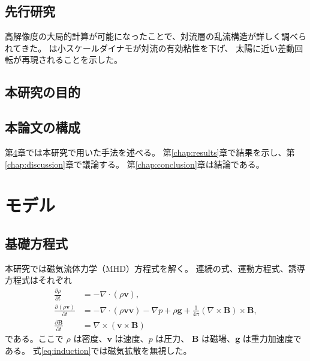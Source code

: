 \section{先行研究}
\label{sec:intro_previous}

高解像度の大局的計算が可能になったことで、対流層の乱流構造が詳しく調べられてきた。
\citet{hotta2021} は小スケールダイナモが対流の有効粘性を下げ、
太陽に近い差動回転が再現されることを示した。

\section{本研究の目的}
\label{sec:intro_purpose}


\section{本論文の構成}
\label{sec:intro_outline}

第\ref{chap:method}章では本研究で用いた手法を述べる。
第\ref{chap:results}章で結果を示し、第\ref{chap:discussion}章で議論する。
第\ref{chap:conclusion}章は結論である。


\chapter{モデル}
\label{chap:method}


\section{基礎方程式}
\label{sec:method_equations}

本研究では磁気流体力学（MHD）方程式を解く。
連続の式、運動方程式、誘導方程式はそれぞれ
\begin{align}
  \frac{\partial \rho}{\partial t} &= -\nabla\cdot(\rho\bm{v}), \label{eq:continuity}\\
  \frac{\partial (\rho\bm{v})}{\partial t}
    &= -\nabla\cdot(\rho\bm{v}\bm{v})
       - \nabla p + \rho\bm{g}
       + \frac{1}{4\pi}(\nabla\times\bm{B})\times\bm{B}, \label{eq:motion}\\
  \frac{\partial \bm{B}}{\partial t} &= \nabla\times(\bm{v}\times\bm{B}) \label{eq:induction}
\end{align}
である。ここで $\rho$ は密度、$\bm{v}$ は速度、$p$ は圧力、
$\bm{B}$ は磁場、$\bm{g}$ は重力加速度である。
式\eqref{eq:induction}では磁気拡散を無視した。

